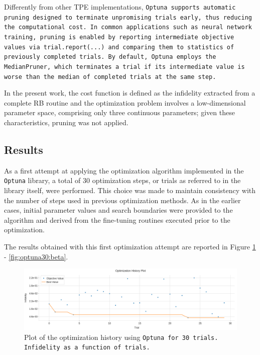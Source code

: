 Differently from other TPE implementations, \tt{Optuna} supports automatic pruning designed to terminate unpromising trials early, thus reducing the computational cost. 
In common applications such as neural network training, pruning is enabled by reporting intermediate objective values via \texttt{trial.report(...)} and comparing them to statistics of previously completed trials. 
By default, \texttt{Optuna} employs the \texttt{MedianPruner}, which terminates a trial if its intermediate value is worse than the median of completed trials at the same step.

In the present work, the cost function is defined as the infidelity extracted from a complete RB routine and the optimization problem involves a low-dimensional parameter space, comprising only three continuous parameters; given these characteristics, pruning was not applied.

\subsection{Results}

As a first attempt at applying the optimization algorithm implemented in the \texttt{Optuna} library, a total of 30 optimization steps, or trials as referred to in the library itself, were performed. 
This choice was made to maintain consistency with the number of steps used in previous optimization methods. 
As in the earlier cases, initial parameter values and search boundaries were provided to the algorithm and derived from the fine-tuning routines executed prior to the optimization.

The results obtained with this first optimization attempt are reported in Figure \ref{fig:optuna30:optimization} - \ref{fig:optuna30:beta}.

\begin{figure}[h!]
    \centering
    \includegraphics[width=\textwidth]{figures/png/RB_optimization/Optuna/30/optimization.png}
    \caption{Plot of the optimization history using \tt{Optuna} for 30 trials. Infidelity as a function of trials.}
    \label{fig:optuna30:optimization}
\end{figure}

